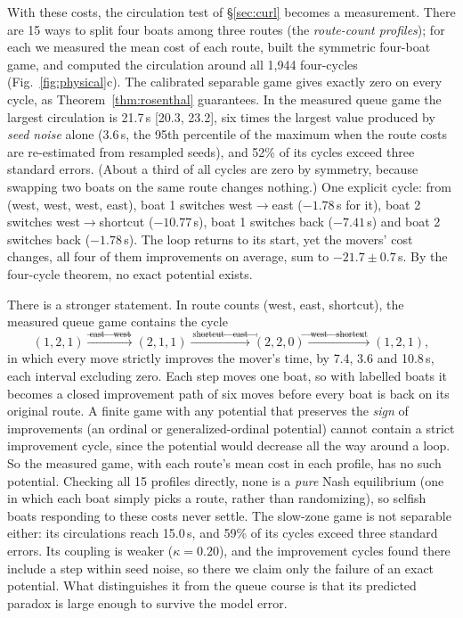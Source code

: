 \documentclass[11pt]{article}
\theoremstyle{definition}
\begin{document}
With these costs, the circulation test of \S\ref{sec:curl} becomes a measurement. There are 15 ways to split four boats among three routes (the \emph{route-count profiles}); for each we measured the mean cost of each route, built the symmetric four-boat game, and computed the circulation around all 1{,}944 four-cycles (Fig.~\ref{fig:physical}c). The calibrated separable game gives exactly zero on every cycle, as Theorem~\ref{thm:rosenthal} guarantees. In the measured queue game the largest circulation is 21.7\,s [20.3, 23.2], six times the largest value produced by \emph{seed noise} alone (3.6\,s, the 95th percentile of the maximum when the route costs are re-estimated from resampled seeds), and 52\% of its cycles exceed three standard errors. (About a third of all cycles are zero by symmetry, because swapping two boats on the same route changes nothing.) One explicit cycle: from (west, west, west, east), boat 1 switches west$\to$east ($-1.78$\,s for it), boat 2 switches west$\to$shortcut ($-10.77$\,s), boat 1 switches back ($-7.41$\,s) and boat 2 switches back ($-1.78$\,s). The loop returns to its start, yet the movers' cost changes, all four of them improvements on average, sum to $-21.7\pm0.7$\,s. By the four-cycle theorem, no exact potential exists.

There is a stronger statement. In route counts (west, east, shortcut), the measured queue game contains the cycle
\[
(1,2,1)\xrightarrow{\ \text{east}\to\text{west}\ }(2,1,1)\xrightarrow{\ \text{shortcut}\to\text{east}\ }(2,2,0)\xrightarrow{\ \text{west}\to\text{shortcut}\ }(1,2,1),
\]
in which every move strictly improves the mover's time, by 7.4, 3.6 and 10.8\,s, each interval excluding zero. Each step moves one boat, so with labelled boats it becomes a closed improvement path of six moves before every boat is back on its original route. A finite game with any potential that preserves the \emph{sign} of improvements (an ordinal or generalized-ordinal potential) cannot contain a strict improvement cycle, since the potential would decrease all the way around a loop. So the measured game, with each route's mean cost in each profile, has no such potential. Checking all 15 profiles directly, none is a \emph{pure} Nash equilibrium (one in which each boat simply picks a route, rather than randomizing), so selfish boats responding to these costs never settle. The slow-zone game is not separable either: its circulations reach 15.0\,s, and 59\% of its cycles exceed three standard errors. Its coupling is weaker ($\kappa=0.20$), and the improvement cycles found there include a step within seed noise, so there we claim only the failure of an exact potential. What distinguishes it from the queue course is that its predicted paradox is large enough to survive the model error.
\end{document}
